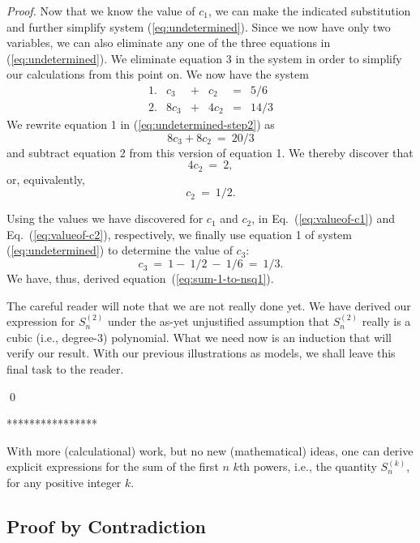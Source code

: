 {\begin{proof}
Now that we know the value of $c_1$, we can make the indicated substitution and further simplify system (\ref{eq:undetermined}).  Since we now have only two variables, we can also eliminate any one of the three equations in (\ref{eq:undetermined}).  We eliminate equation 3 in the system in order to simplify our calculations from this point on.  We now have the system
\begin{equation}
\label{eq:undetermined-step2}
\begin{array}{lccccc}
1. &
c_3  & + & c_2   & = & 5/6 \\
2. &
8c_3 & + & 4 c_2 & = & 14/3 
\end{array}
\end{equation}
We rewrite equation 1 in (\ref{eq:undetermined-step2}) as
\[ 8 c_3 + 8 c_2 \ = \ 20/3 \]
and subtract equation 2 from this version of equation 1.  We thereby discover that
\[ 4 c_2 \ = \ 2, \]
or, equivalently,
\begin{equation}
\label{eq:valueof-c2}
c_2 \ = \ 1/2.
\end{equation}

Using the values we have discovered for $c_1$ and $c_2$, in Eq.~(\ref{eq:valueof-c1}) and Eq.~(\ref{eq:valueof-c2}), respectively, we finally use equation 1 of system (\ref{eq:undetermined}) to determine the value of $c_3$:
\begin{equation}
\label{eq:valueof-c3}
c_3 \ = \ 1 - \ 1/2 \ - \ 1/6 \ = \ 1/3.
\end{equation}
We have, thus, derived equation~(\ref{eq:sum-1-to-nsq1}).

\medskip

The careful reader will note that we are not really done yet.  We have derived our expression for $S^{(2)}_n$ under the as-yet unjustified assumption that $S^{(2)}_n$ really is a cubic (i.e.,
degree-$3$) polynomial.  What we need now is an induction that will
verify our result.  With our previous illustrations as models, we
shall leave this final task to the reader.

\qed
\end{proof}
****************}

\bigskip

With more (calculational) work, but no new (mathematical) ideas, one can derive explicit expressions for the sum of the first $n$ $k$th powers, i.e., the quantity $S^{(k)}_n$, for any positive integer $k$.


\subsection{Proof by Contradiction}
\label{sec:Contradiction}

